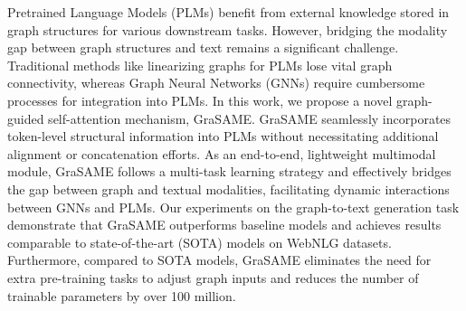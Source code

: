 Pretrained Language Models (PLMs) benefit from external knowledge stored in graph structures for various downstream tasks. However, bridging the modality gap between graph structures and text remains a significant challenge. Traditional methods like linearizing graphs for PLMs lose vital graph connectivity, whereas Graph Neural Networks (GNNs) require cumbersome processes for integration into PLMs. In this work, we propose a novel graph-guided self-attention mechanism, GraSAME. GraSAME seamlessly incorporates token-level structural information into PLMs without necessitating additional alignment or concatenation efforts. As an end-to-end, lightweight multimodal module, GraSAME follows a multi-task learning strategy and effectively bridges the gap between graph and textual modalities, facilitating dynamic interactions between GNNs and PLMs. Our experiments on the graph-to-text generation task demonstrate that GraSAME outperforms baseline models and achieves results comparable to state-of-the-art (SOTA) models on WebNLG datasets. Furthermore, compared to SOTA models, GraSAME eliminates the need for extra pre-training tasks to adjust graph inputs and reduces the number of trainable parameters by over 100 million.